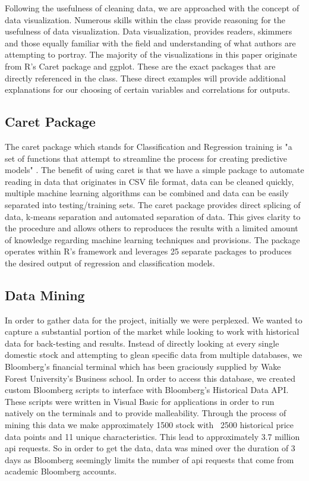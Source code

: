 \documentclass[paper=letter, fontsize=11pt]{scrartcl}
\numberwithin{equation}{section}		%
\numberwithin{figure}{section}			%
\numberwithin{table}{section}				%
\begin{document}
\begin{spacing}{2}
Following the usefulness of cleaning data, we are approached with the concept of data visualization. Numerous skills within the class provide reasoning for the usefulness of data visualization. Data visualization, provides readers, skimmers and those equally familiar with the field and understanding of what authors are attempting to portray. The majority of the visualizations in this paper originate from R's Caret package and ggplot. These are the exact packages that are directly referenced in the class. These direct examples will provide additional explanations for our choosing of certain variables and correlations for outputs. 
\subsection{Caret Package}
The caret package which stands for Classification and Regression training is "a set of functions that attempt to streamline the process for creating predictive models" \cite{caret}. The benefit of using caret is that we have a simple package to automate reading in data that originates in CSV file format, data can be cleaned quickly, multiple machine learning algorithms can be combined and data can be easily separated into testing/training sets. The caret package provides direct splicing of data, k-means separation and automated separation of data. This gives clarity to the procedure and allows others to reproduces the results with a limited amount of knowledge regarding machine learning techniques and provisions\cite{Kuhn}. The package operates within R's framework and leverages 25 separate packages to produces the desired output of regression and classification models. 

\subsection{Data Mining}
In order to gather data for the project, initially we were perplexed. We wanted to capture a substantial portion of the market while looking to work with historical data for back-testing and results. Instead of directly looking at every single domestic stock and attempting to glean specific data from multiple databases, we Bloomberg's financial terminal which has been graciously supplied by Wake Forest University's Business school. In order to access this database, we created custom Bloomberg scripts to interface with Bloomberg's Historical Data API. These scripts were written in Visual Basic for applications in order to run natively on the terminals and to provide malleability. Through the process of mining this data we make approximately 1500 stock with ~2500 historical price data points and 11 unique characteristics. This lead to approximately 3.7 million api requests. So in order to get the data, data was mined over the duration of 3 days as Bloomberg seemingly limits the number of api requests that come from academic Bloomberg accounts\cite{Bloomberg}. 


\end{spacing}
\end{document}
